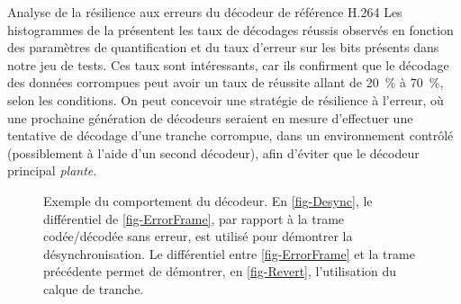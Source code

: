 \begin{section}{Analyse de la résilience aux erreurs du décodeur de référence H.264}
Les histogrammes de la  présentent les taux de décodages
réussis observés en fonction des paramètres de quantification et du taux
d'erreur sur les bits présents dans notre jeu de tests. Ces taux sont
intéressants, car ils confirment que le décodage des données corrompues peut
avoir un taux de réussite allant de 20~\% à 70~\%, selon les conditions. On peut
concevoir une stratégie de résilience à l'erreur, où une prochaine génération de
décodeurs seraient en mesure d'effectuer une tentative de décodage d'une tranche
corrompue, dans un environnement contrôlé (possiblement à l'aide d'un second
décodeur), afin d'éviter que le décodeur principal \textit{plante}.

\begin{figure}
	\caption[Exemple du comportement du décodeur]{Exemple du comportement du
décodeur. En \ref{fig-Desync}, le différentiel de \ref{fig-ErrorFrame},
par rapport à la trame codée/décodée sans erreur, est utilisé pour démontrer la
désynchronisation. Le différentiel entre \ref{fig-ErrorFrame} et la trame
précédente permet de démontrer, en \ref{fig-Revert}, l'utilisation du calque
de tranche.}
	\label{fig-DecoderBehavior}
\end{figure}


\end{section}
